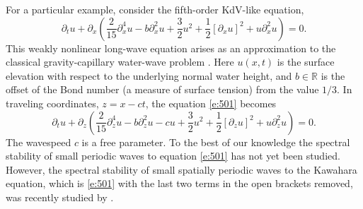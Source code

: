 \documentclass[review,onefignum,onetabnum]{siamart171218}
\newcommand{\R}{\mathbb{R}}
\begin{document}
For a particular example, consider the fifth-order KdV-like equation,
\begin{equation}\label{e:501}
\partial_tu+\partial_x\left(\frac2{15}\partial_x^4u-b\partial_x^2u+\frac32u^2
+\frac12[\partial_xu]^2+u\partial_x^2u\right)=0.
\end{equation}
This weakly nonlinear long-wave equation arises as an approximation to the
classical gravity-capillary water-wave problem \cite{champneys:agi97}. Here
$u(x,t)$ is the surface elevation with respect to the underlying normal water
height, and $b\in\R$ is the offset of the Bond number (a measure of surface
tension) from the value $1/3$.
In traveling coordinates, $z=x-ct$, the
equation \cref{e:501} becomes
\begin{equation}\label{e:502}
\partial_tu+\partial_z\left(\frac2{15}\partial_z^4u-b\partial_z^2u-cu+\frac32u^2
+\frac12[\partial_zu]^2+u\partial_z^2u\right)=0.
\end{equation}
The wavespeed $c$ is a free parameter. To the best of our knowledge the spectral stability of small periodic waves to equation \cref{e:501} has not yet been studied.
However, the spectral stability of small spatially periodic waves to the Kawahara equation, which is \cref{e:501} with the last two terms in the open brackets removed, was recently studied by \cite{trichtchenko:sop18}.
\end{document}
